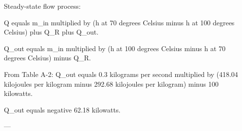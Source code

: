 Steady-state flow process:  

Q equals m_in multiplied by (h at 70 degrees Celsius minus h at 100 degrees Celsius) plus Q_R plus Q_out.  

Q_out equals m_in multiplied by (h at 100 degrees Celsius minus h at 70 degrees Celsius) minus Q_R.  

From Table A-2:  
Q_out equals 0.3 kilograms per second multiplied by (418.04 kilojoules per kilogram minus 292.68 kilojoules per kilogram) minus 100 kilowatts.  

Q_out equals negative 62.18 kilowatts.  

---